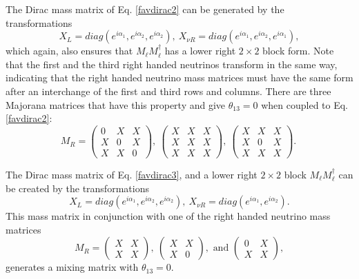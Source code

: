 \documentclass[nofootinbib,showpacs]{revtex4}
\begin{document}
The Dirac mass matrix of Eq. \ref{favdirac2} can be generated by the transformations
\begin{equation}
X_L=diag(e^{i \alpha_1},e^{i \alpha_2},e^{i \alpha_2}),\: X_{\nu R}=diag(e^{i \alpha_1},e^{i \alpha_2},e^{i \alpha_1}),
\end{equation}
which again, also ensures that $M_{\ell} M_{\ell}^\dagger$ has a lower right $2\times 2$ block form. Note that the first and the third right handed neutrinos transform in the same way, indicating that the right handed neutrino mass matrices must have the same form after an interchange of the first and third rows and columns. There are three Majorana matrices that have this property and give $\theta_{13}=0$ when coupled to Eq. \ref{favdirac2}:
\begin{equation}\label{favmaj2}
M_R=\left(\begin{array}{ccc}0&X&X\\X&0&X\\X&X&0\end{array}\right),\:
\left(\begin{array}{ccc}X&X&X\\X&X&X\\X&X&X\end{array}\right),\:
\left(\begin{array}{ccc}X&X&X\\X&0&X\\X&X&X\end{array}\right).\:
\end{equation}


The Dirac mass matrix of Eq. \ref{favdirac3}, and a lower right $2\times 2$ block $M_{\ell} M_{\ell}^\dagger$  can be created by the transformations 
\begin{equation}
X_L=diag(e^{i \alpha_1},e^{i \alpha_2},e^{i \alpha_2}),\: X_{\nu R}=diag(e^{i \alpha_1},e^{i \alpha_2}).
\end{equation}
This mass matrix in conjunction with one of the right handed neutrino mass matrices
\begin{equation}\label{2by2maj}
M_R=\left(\begin{array}{cc}X&X\\X&X\end{array}\right),\: \left(\begin{array}{cc}X&X\\X&0\end{array}\right),\textrm{ and } \left(\begin{array}{cc}0&X\\X&X\end{array}\right), 
\end{equation}
generates a mixing matrix with $\theta_{13}=0$.
\end{document}
